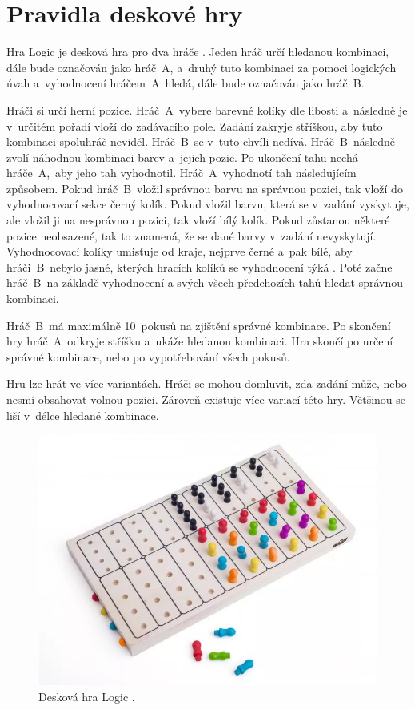 \chapter{Pravidla deskové hry}
Hra Logic je desková hra pro dva hráče \cite{Logic_pravidla}. Jeden hráč určí hledanou kombinaci, dále bude označován jako 
hráč~A, a~druhý tuto kombinaci za pomoci logických úvah a~vyhodnocení hráčem~A~hledá, dále bude označován jako hráč~B.

Hráči si určí herní pozice. Hráč~A~vybere barevné kolíky dle libosti a~následně je v~určitém pořadí vloží do zadávacího pole. Zadání zakryje
stříškou, aby tuto
kombinaci spoluhráč neviděl. Hráč~B~se v~tuto chvíli nedívá. Hráč~B~následně zvolí náhodnou kombinaci barev a~jejich pozic. Po 
ukončení tahu nechá
hráče~A,~aby jeho tah vyhodnotil. Hráč~A~vyhodnotí tah následujícím způsobem. Pokud hráč~B~vložil správnou barvu na správnou pozici, tak vloží 
do vyhodnocovací sekce černý kolík. Pokud vložil barvu, která se v~zadání vyskytuje, ale vložil ji na nesprávnou pozici, tak vloží bílý kolík.
Pokud zůstanou některé pozice neobsazené, tak to znamená, že se dané barvy v~zadání nevyskytují. 
Vyhodnocovací kolíky umisťuje od kraje, nejprve černé a~pak bílé, aby hráči~B~nebylo jasné, kterých hracích kolíků se vyhodnocení 
týká \cite{Logic_pravidla}.
Poté začne hráč~B~na základě vyhodnocení a svých všech předchozích tahů hledat správnou kombinaci.

Hráč~B~má maximálně 10~pokusů na zjištění správné kombinace. Po skončení hry hráč~A~odkryje stříšku a~ukáže hledanou kombinaci. Hra skončí po 
určení správné 
kombinace, nebo po vypotřebování všech pokusů.

Hru lze hrát ve více variantách. Hráči se mohou domluvit, zda zadání může, nebo nesmí obsahovat volnou pozici. Zároveň existuje 
více variací této hry. Většinou se liší v~délce hledané kombinace.

\begin{figure}[!h]
  \begin{center}
    \includegraphics[scale=0.6]{obrazky/Logic_deskovka.png}
  \end{center}
  \caption[Desková hra Logic \cite{Logic_deskovka}]{Desková hra Logic \cite{Logic_deskovka}.}
\end{figure}

